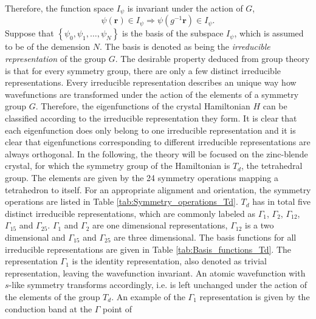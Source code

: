 Therefore, the function space $I_{\psi}$ is invariant under the action
of $G$, \begin{equation}
\psi(\mathbf{r})\in I_{\psi}\Rightarrow\psi(g^{-1}\mathbf{r})\in I_{\psi}.\end{equation}
Suppose that $\left\{ \psi_{0},\psi_{1},\ldots,\psi_{N}\right\} $
is the basis of the subspace $I_{\psi}$, which is assumed to be of
the demension $N$. The basis is denoted as being the\emph{ irreducible
representation} of the group $G$. The desirable property deduced
from group theory is that for every symmetry group, there are only
a few distinct irreducible representations. Every irreducible representation
describes an unique way how wavefunctions are transformed under the
action of the elements of a symmetry group $G$. Therefore, the eigenfunctions
of the crystal Hamiltonian $H$ can be classified according to the
irreducible representation they form. It is clear that each eigenfunction
does only belong to one irreducible representation and it is clear
that eigenfunctions corresponding to different irreducible representations
are always orthogonal. In the following, the theory will be focused
on the zinc-blende crystal, for which the symmetry group of the Hamiltonian
is $T_{d}$, the tetrahedral group. The elements are given by the
24 symmetry operations mapping a tetrahedron to itself. For an appropriate
alignment and orientation, the symmetry operations are listed in Table
\ref{tab:Symmetry_operations_Td}. $T_{d}$ has in total five distinct
irreducible representations, which are commonly labeled as $\Gamma_{1}$,
$\Gamma_{2}$, $\Gamma_{12}$, $\Gamma_{15}$ and $\Gamma_{25}$.
$\Gamma_{1}$ and $\Gamma_{2}$ are one dimensional representations,
$\Gamma_{12}$ is a two dimensional and $\Gamma_{15}$ and $\Gamma_{25}$
are three dimensional. The basis functions for all irreducible representations
are given in Table \ref{tab:Basis_functions_Td}. The representation
$\Gamma_{1}$ is the identity representation, also denoted as trivial
representation, leaving the wavefunction invariant. An atomic wavefunction
with $s$-like symmetry transforms accordingly, i.e. is left unchanged
under the action of the elements of the group $T_{d}$. An example
of the $\Gamma_{1}$ representation is given by the conduction band
at the $\Gamma$ point of %
